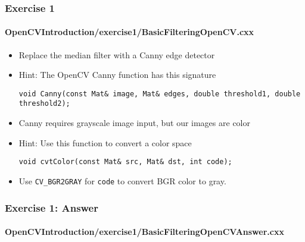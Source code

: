 \begin{frame}[fragile]
\frametitle{Exercise 1}
\framesubtitle{OpenCVIntroduction/exercise1/BasicFilteringOpenCV.cxx}
\begin{center}
\begin{itemize}
\item Replace the median filter with a Canny edge detector
\pause
\item Hint: The OpenCV Canny function has this signature
\begin{lstlisting}[numbers=none,xleftmargin=0pt]
void Canny(const Mat& image, Mat& edges, double threshold1, double threshold2);
\end{lstlisting}
\pause
\item Canny requires grayscale image input, but our images are color
\item Hint: Use this function to convert a color space
\begin{lstlisting}[numbers=none,xleftmargin=0pt]
void cvtColor(const Mat& src, Mat& dst, int code);
\end{lstlisting}
\item Use {\tt CV\_BGR2GRAY} for {\tt code} to convert BGR color to gray.
\end{itemize}
\end{center}
\end{frame}

\begin{frame}[fragile]
\frametitle{Exercise 1: Answer}
\framesubtitle{OpenCVIntroduction/exercise1/BasicFilteringOpenCVAnswer.cxx}
\begin{center}
\begin{itemize}
\end{itemize}
\end{center}
\end{frame}
